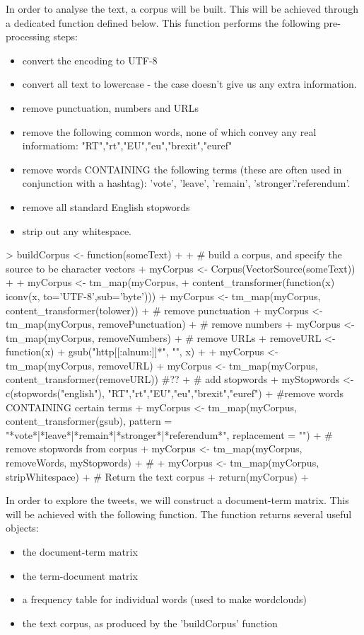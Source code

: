\documentclass[10pt]{article}
\begin{document}
In order to analyse the text, a corpus will be built. This will be achieved through a dedicated function defined below. This function performs the following pre-processing steps:

\begin{itemize}
  \item convert the encoding to UTF-8
  \item convert all text to lowercase - the case doesn't give us any extra information.
  \item remove punctuation, numbers and URLs
  \item remove the following common words, none of which convey any real informatiom: "RT","rt","EU","eu","brexit","euref"
  \item remove words CONTAINING the following terms (these are often used in conjunction with a hashtag): 'vote', 'leave', 'remain', 'stronger'.'referendum'.
  \item remove all standard English stopwords
  \item strip out any whitespace.
\end{itemize}

\begin{Schunk}
\begin{Sinput}
> buildCorpus <- function(someText){
+   
+   # build a corpus, and specify the source to be character vectors
+   myCorpus <- Corpus(VectorSource(someText))
+ 
+   myCorpus <- tm_map(myCorpus,
+                      content_transformer(function(x) iconv(x, to='UTF-8',sub='byte')))
+   myCorpus <- tm_map(myCorpus, content_transformer(tolower))
+   # remove punctuation
+   myCorpus <- tm_map(myCorpus, removePunctuation)
+   # remove numbers
+   myCorpus <- tm_map(myCorpus, removeNumbers)
+   # remove URLs
+   removeURL <- function(x) {
+     gsub("http[[:alnum:]]*", "", x)
+   }
+   myCorpus <- tm_map(myCorpus, removeURL)
+   myCorpus <- tm_map(myCorpus, content_transformer(removeURL)) #??
+   # add stopwords
+   myStopwords <- c(stopwords("english"), "RT","rt","EU","eu","brexit","euref")
+   #remove words CONTAINING certain terms
+   myCorpus <- tm_map(myCorpus, content_transformer(gsub), pattern = "*vote*|*leave*|*remain*|*stronger*|*referendum*", replacement = "")
+   # remove stopwords from corpus
+   myCorpus <- tm_map(myCorpus, removeWords, myStopwords)
+   #
+   myCorpus <- tm_map(myCorpus, stripWhitespace)
+   # Return the text corpus
+   return(myCorpus)
+ }
\end{Sinput}
\end{Schunk}
In order to explore the tweets, we will construct a document-term matrix. This will be achieved with the following function. The function returns several useful objects:
\begin{itemize}
  \item the document-term matrix
  \item the term-document matrix
  \item a frequency table for individual words (used to make wordclouds)
  \item the text corpus, as produced by the 'buildCorpus' function
\end{itemize}
\end{document}
